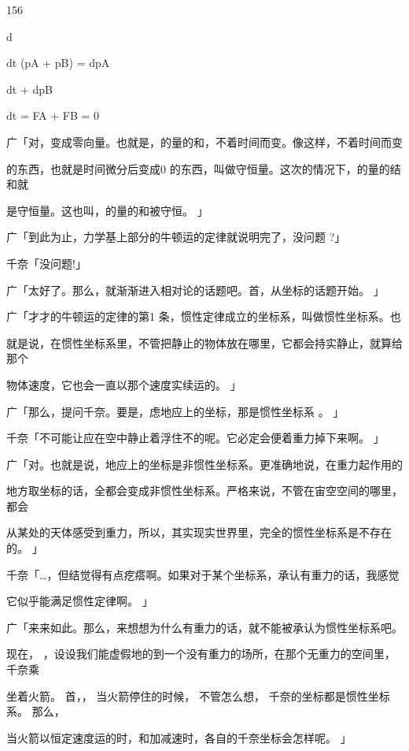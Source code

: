 156\par
d\par
dt (pA + pB) = dpA\par
dt + dpB\par
dt = FA + FB = 0\par
广「对，变成零向量。也就是，的量的和，不着时间而变。像这样，不着时间而变\par
的东西，也就是时间微分后变成0 的东西，叫做守恒量。这次的情况下，的量的结和就\par
是守恒量。这也叫，的量的和被守恒。 」\par
广「到此为止，力学基上部分的牛顿运的定律就说明完了，没问题 ?」\par
千奈「没问题!」\par
广「太好了。那么，就渐渐进入相对论的话题吧。首，从坐标的话题开始。 」\par
广「才才的牛顿运的定律的第1 条，惯性定律成立的坐标系，叫做惯性坐标系。也\par
就是说，在惯性坐标系里，不管把静止的物体放在哪里，它都会持实静止，就算给那个\par
物体速度，它也会一直以那个速度实续运的。 」\par
广「那么，提问千奈。要是，虑地应上的坐标，那是惯性坐标系 。 」\par
千奈「不可能让应在空中静止着浮住不的呢。它必定会便着重力掉下来啊。 」\par
广「对。也就是说，地应上的坐标是非惯性坐标系。更准确地说，在重力起作用的\par
地方取坐标的话，全都会变成非惯性坐标系。严格来说，不管在宙空空间的哪里，都会\par
从某处的天体感受到重力，所以，其实现实世界里，完全的惯性坐标系是不存在的。 」\par
千奈「…，但结觉得有点疙瘩啊。如果对于某个坐标系，承认有重力的话，我感觉\par
它似乎能满足惯性定律啊。 」\par
广「来来如此。那么，来想想为什么有重力的话，就不能被承认为惯性坐标系吧。\par
现在， ，设设我们能虚假地的到一个没有重力的场所，在那个无重力的空间里，千奈乘\par
坐着火箭。 首，， 当火箭停住的时候， 不管怎么想， 千奈的坐标都是惯性坐标系。 那么，\par
当火箭以恒定速度运的时，和加减速时，各自的千奈坐标会怎样呢。 」\par

